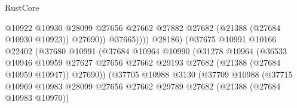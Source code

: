 \begin{lexlean}{RustCore}
\begin{coremodule}
                                                      @10922
                                                      @10930
                                                      @28099
                                                      @27656
                                                      @27662
                                                      @27882
                                                      @27682
                                                      (@21388 (@27684 @10930 @10923))
                                                      @27690))
                                                  @37665))))
                                          @28186)
                                        (@37675
                                          @10991
                                          @10166
                                          @22402
                                          (@37680
                                            @10991
                                            (@37684
                                              @10964
                                              @10990
                                              (@31278
                                                @10964
                                                (@36533
                                                  @10946
                                                  @10959
                                                  @27627
                                                  @27656
                                                  @27662
                                                  @29193
                                                  @27682
                                                  (@21388 (@27684 @10959 @10947))
                                                  @27690))
                                              (@37705
                                                @10988
                                                @3130
                                                (@37709
                                                  @10988
                                                  (@37715
                                                    @10969
                                                    @10983
                                                    @28099
                                                    @27656
                                                    @27662
                                                    @29789
                                                    @27682
                                                    (@21388 (@27684 @10983 @10970))

\end{coremodule}
\end{lexlean}
